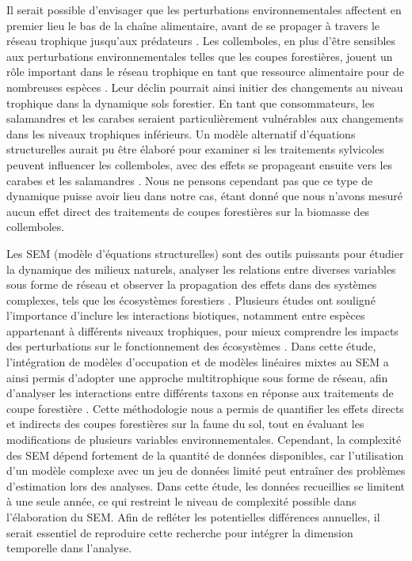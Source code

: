Il serait possible d'envisager que les perturbations environnementales affectent en premier lieu le bas de la chaîne alimentaire, avant de se propager à travers le réseau trophique jusqu'aux prédateurs \citep{Chauvat2014Responsesoil,Laigle2021Directindirect}. 
Les collemboles, en plus d'être sensibles aux perturbations environnementales telles que les coupes forestières, jouent un rôle important dans le réseau trophique en tant que ressource alimentaire pour de nombreuses espèces \citep{Burton1975Energyflow,Bauer1982Predationcarabid,rusekBiodiversityCollembolaTheir1998,Chauvat2014Responsesoil}. 
Leur déclin pourrait ainsi initier des changements au niveau trophique dans la dynamique sols forestier.
En tant que consommateurs, les salamandres et les carabes seraient particulièrement vulnérables aux changements dans les niveaux trophiques inférieurs. 
Un modèle alternatif d'équations structurelles aurait pu être élaboré pour examiner si les traitements sylvicoles peuvent influencer les collemboles, avec des effets se propageant ensuite vers les carabes et les salamandres \citep{Laigle2021Directindirect}. 
Nous ne pensons cependant pas que ce type de dynamique puisse avoir lieu dans notre cas, étant donné que nous n'avons mesuré aucun effet direct des traitements de coupes forestières sur la biomasse des collemboles. 

Les SEM (modèle d’équations structurelles) sont des outils puissants pour étudier la dynamique des milieux naturels, analyser les relations entre diverses variables sous forme de réseau et observer la propagation des effets dans des systèmes complexes, 
tels que les écosystèmes forestiers \citep{graceSpecificationStructuralEquation2010}.  
Plusieurs études ont souligné l’importance d’inclure les interactions biotiques, notamment entre espèces appartenant à différents niveaux trophiques, pour mieux comprendre les impacts des perturbations 
sur le fonctionnement des écosystèmes \citep{Thebault2003Foodwebconstraints,Seibold2018necessitymultitrophic,Laigle2021Directindirect}.  
Dans cette étude, l’intégration de modèles d’occupation et de modèles linéaires mixtes au SEM a ainsi permis d’adopter une approche multitrophique sous forme de réseau, 
afin d’analyser les interactions entre différents taxons en réponse aux traitements de coupe forestière \citep{josephIntegratingOccupancyModels2016}.  
Cette méthodologie nous a permis de quantifier les effets directs et indirects des coupes forestières sur la faune du sol, tout en évaluant les modifications de plusieurs variables environnementales. 
Cependant, la complexité des SEM dépend fortement de la quantité de données disponibles, car l’utilisation d’un modèle complexe avec un jeu de données limité peut entraîner des problèmes d’estimation lors des analyses.  
Dans cette étude, les données recueillies se limitent à une seule année, ce qui restreint le niveau de complexité possible dans l'élaboration du SEM. 
Afin de refléter les potentielles différences annuelles, il serait essentiel de reproduire cette recherche pour intégrer la dimension temporelle dans l’analyse.

